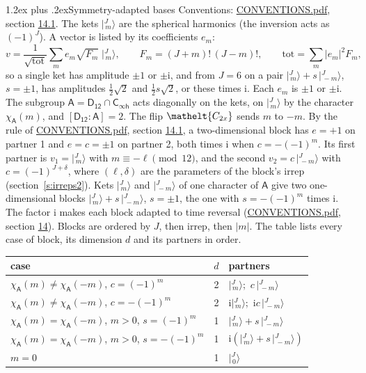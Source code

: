 \documentclass[10pt,a4paper]{article}
\makeatletter
\renewcommand\section{\@startsection{section}{1}{\z@}{-3ex plus -1ex minus -.2ex}%
  {1.2ex plus .2ex}{\normalfont\large\sffamily\bfseries\color{parttitle}}}
\numberwithin{equation}{section}
\newcommand{\eltfont}[1]{{\let\sigma\eltsigma\mathelt{#1}}}
\newcommand{\grp}[1]{\mathsf{#1}}
\newcommand{\elt}[1]{\eltfont{#1}}
\newcommand{\grpindex}[2]{[#1 : #2]}
\newcommand{\iunit}{\mathrm{i}}
\newcommand{\chiA}{\chi_{\grp{A}}}
\newcommand{\jm}[2]{\bigl\lvert{}^{#1}_{\,#2}\bigr\rangle}
\makeatother
\begin{document}
\section{Symmetry-adapted bases}\label{s:bases}
Conventions: \href{../../CONVENTIONS.pdf}{CONVENTIONS.pdf}, section \href{../../CONVENTIONS.pdf\#conv.14.1}{14.1}.
\leavevmode\label{n:index.m}\label{n:vector.ket}The kets $\jm{J}{m}$ are the spherical harmonics (the inversion acts as $(-1)^J$). \label{n:index.ketcoefficient}\label{n:vector.basis.symmetry}\label{n:index.ketweight}\label{n:index.total}A vector is listed by its coefficients $e_m$:
\begin{equation}\label{e:ket}v = \frac{1}{\sqrt{\mathrm{tot}}}\sum_m e_m\sqrt{F_m}\;\jm{J}{m},\qquad F_m = (J+m)!\,(J-m)!,\qquad \mathrm{tot} = \sum_m |e_m|^2F_m,\end{equation}
\leavevmode\label{n:index.pair.sign}so a single ket has amplitude $\pm1$ or $\pm\iunit$, and from $J = 6$ on a pair $\jm{J}{m} + s\,\jm{J}{-m}$, $s = \pm1$, has amplitudes $\tfrac{1}{2}\sqrt{2}$ and $\tfrac{1}{2}s\sqrt{2}$, or these times $\iunit$. Each $e_m$ is $\pm1$ or $\pm\iunit$.
\leavevmode\label{n:group.A}\label{n:function.character.abelian}The subgroup $\grp{A} = \grp{D_{12}}\cap\grp{C_{\infty h}}$ acts diagonally on the kets, on $\jm{J}{m}$ by the character $\chiA(m)$, and $\grpindex{\grp{D_{12}}}{\grp{A}} = 2$. The flip $\elt{C_{2x}}$ sends $m$ to $-m$. \label{n:index.partner.sign}By the rule of \href{../../CONVENTIONS.pdf}{CONVENTIONS.pdf}, section \href{../../CONVENTIONS.pdf\#conv.14.1}{14.1}, a two-dimensional block has $e = +1$ on partner 1 and $e = c = \pm1$ on partner 2, both times $\iunit$ when $c = -(-1)^m$. Its first partner is $v_1 = \jm{J}{m}$ with $m \equiv -\ell \pmod{12}$, and the second $v_2 = c\,\jm{J}{-m}$ with $c = (-1)^{J+\delta}$, where $(\ell, \delta)$ are the parameters of the block's irrep (section~\ref{s:irreps2}). Kets $\jm{J}{m}$ and $\jm{J}{-m}$ of one character of $\grp{A}$ give two one-dimensional blocks $\jm{J}{m} + s\,\jm{J}{-m}$, $s = \pm1$, the one with $s = -(-1)^m$ times $\iunit$. The factor $\iunit$ makes each block adapted to time reversal (\href{../../CONVENTIONS.pdf}{CONVENTIONS.pdf}, section \href{../../CONVENTIONS.pdf\#conv.14}{14}). Blocks are ordered by $J$, then irrep, then $|m|$.
\leavevmode\label{n:head.case}\label{n:head.partners}The table lists every case of block, its dimension $d$ and its partners in order.
\begin{center}\begin{tabular}{@{}lrl@{}}\toprule
case & $d$ & partners\\\midrule
$\chiA(m) \ne \chiA(-m)$, $c = (-1)^m$ & 2 & $\jm{J}{m}$;\ $c\,\jm{J}{-m}$\\
$\chiA(m) \ne \chiA(-m)$, $c = -(-1)^m$ & 2 & $\iunit\jm{J}{m}$;\ $\iunit c\,\jm{J}{-m}$\\
$\chiA(m) = \chiA(-m)$, $m > 0$, $s = (-1)^m$ & 1 & $\jm{J}{m} + s\,\jm{J}{-m}$\\
$\chiA(m) = \chiA(-m)$, $m > 0$, $s = -(-1)^m$ & 1 & $\iunit(\jm{J}{m} + s\,\jm{J}{-m})$\\
$m = 0$ & 1 & $\jm{J}{0}$\\
\bottomrule\end{tabular}\end{center}
\end{document}
